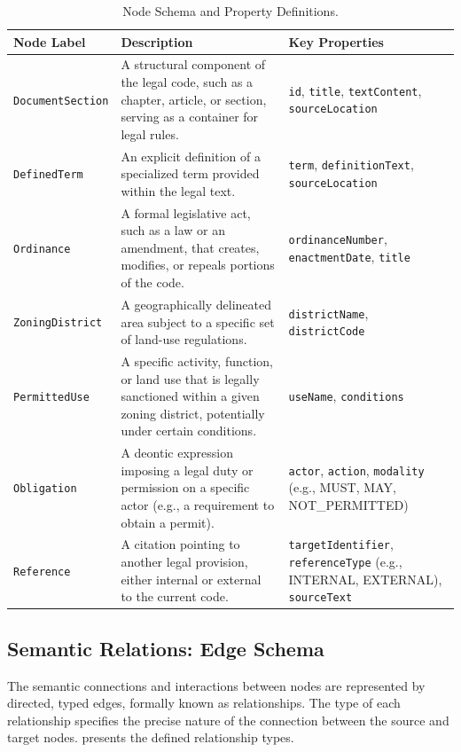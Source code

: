 \begin{table}[htbp]
\centering
{}
\begin{tabularx}{\textwidth}{@{} >{\raggedright}p{} >{\raggedright}p{} >{\raggedright\arraybackslash}p{} @{}}
\toprule
\textbf{Node Label} & \textbf{Description} & \textbf{Key Properties} \\ 
\midrule
\texttt{DocumentSection} & A structural component of the legal code, such as a chapter, article, or section, serving as a container for legal rules. & \texttt{id}, \texttt{title}, \texttt{textContent}, \texttt{sourceLocation} \\ 
\addlinespace
\texttt{DefinedTerm} & An explicit definition of a specialized term provided within the legal text. & \texttt{term}, \texttt{definitionText}, \texttt{sourceLocation} \\ 
\addlinespace
\texttt{Ordinance} & A formal legislative act, such as a law or an amendment, that creates, modifies, or repeals portions of the code. & \texttt{ordinanceNumber}, \texttt{enactmentDate}, \texttt{title} \\ 
\addlinespace
\texttt{ZoningDistrict} & A geographically delineated area subject to a specific set of land-use regulations. & \texttt{districtName}, \texttt{districtCode} \\ 
\addlinespace
\texttt{PermittedUse} & A specific activity, function, or land use that is legally sanctioned within a given zoning district, potentially under certain conditions. & \texttt{useName}, \texttt{conditions} \\ 
\addlinespace
\texttt{Obligation} & A deontic expression imposing a legal duty or permission on a specific actor (e.g., a requirement to obtain a permit). & \texttt{actor}, \texttt{action}, \texttt{modality} (e.g., MUST, MAY, NOT\_PERMITTED) \\ 
\addlinespace
\texttt{Reference} & A citation pointing to another legal provision, either internal or external to the current code. & \texttt{targetIdentifier}, \texttt{referenceType} (e.g., INTERNAL, EXTERNAL), \texttt{sourceText} \\ 
\bottomrule
\end{tabularx}
\caption{Node Schema and Property Definitions.}
\label{tab:node_schema}
\end{table}

\subsection{Semantic Relations: Edge Schema}
The semantic connections and interactions between nodes are represented by directed, typed edges, formally known as relationships. The type of each relationship specifies the precise nature of the connection between the source and target nodes.  presents the defined relationship types.


